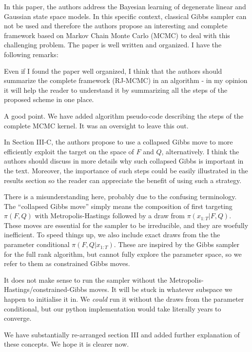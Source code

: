 \documentclass{article}
\newenvironment{review}[0]{\begin{itshape}\color{Gray}\noindent}{\end{itshape}\vspace{0.4cm}}
\newenvironment{response}[0]{\noindent}{\vspace{0.4cm}}
\begin{document}
\begin{review}
In this paper, the authors address the Bayesian learning of degenerate linear and Gaussian state space models. In this specific context, classical Gibbs sampler can not be used and therefore the authors propose an interesting and complete framework based on Markov Chain Monte Carlo (MCMC) to deal with this challenging problem. The paper is well written and organized. I have the following remarks:

Even if I found the paper well organized, I think that the authors should summarize the complete framework (RJ-MCMC) in an algorithm - in my opinion it will help the reader to understand it by summarizing all the steps of the proposed scheme in one place.
\end{review}

\begin{response}
 A good point. We have added algorithm pseudo-code describing the steps of the complete MCMC kernel. It was an oversight to leave this out.
\end{response}

\begin{review}
In Section III-C, the authors propose to use a collapsed Gibbs move to more efficiently exploit the target on the space of $F$ and $Q$, alternatively. I think the authors should discuss in more details why such collapsed Gibbs is important in the text. Moreover, the importance of such steps could be easily illustrated in the results section so the reader can appreciate the benefit of using such a strategy.
\end{review}

\begin{response}
 There is a misunderstanding here, probably due to the confusing terminology. The ``collapsed Gibbs move'' simply means the composition of first targeting $\pi(F, Q)$ with Metropolis-Hastings followed by a draw from $\pi(x_{1:T}|F, Q)$. These moves are essential for the sampler to be irreducible, and they are woefully inefficient. To speed things up, we also include exact draws from the the parameter conditional $\pi(F, Q|x_{1:T})$. These are inspired by the Gibbs sampler for the full rank algorithm, but cannot fully explore the parameter space, so we refer to them as constrained Gibbs moves.
 
 It does not make sense to run the sampler without the Metropolis-Hastings/constrained-Gibbs moves. It will be stuck in whatever subspace we happen to initialise it in. We {\em could} run it without the draws from the parameter conditional, but our python implementation would take literally years to converge.
 
 We have substantially re-arranged section III and added further explanation of these concepts. We hope it is clearer now.
\end{response}
\end{document}
